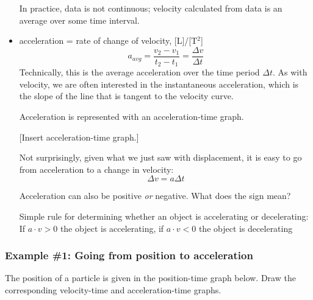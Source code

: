 \begin{itemize}
In practice, data is not continuous; velocity calculated from data is an average over some time interval.



\item acceleration = rate of change of velocity, [L]/[T$^2$]
$$a_{avg}=\frac{v_2-v_1}{t_2-t_1}=\frac{\Delta{v}}{\Delta{t}}$$
  Technically, this is the average acceleration over the time period $\Delta t$. As with velocity, we are often interested in the instantaneous acceleration, which is the slope of the line that is tangent to the velocity curve.

Acceleration is represented with an acceleration-time graph.

[Insert acceleration-time graph.]
\vspace{4cm}
  
Not surprisingly, given what we just saw with displacement, it is easy to go from acceleration to a change in velocity:
$$\Delta{v}=a\Delta{t}$$

Acceleration can also be positive \textit{or} negative. What does the sign mean?

Simple rule for determining whether an object is accelerating or decelerating:\\
If $a\cdot v>0$ the object is accelerating, if $a\cdot v<0$ the object is decelerating  
\end{itemize}


\subsubsection{Example \#1: Going from position to acceleration}
The position of a particle is given in the position-time graph below. Draw the corresponding velocity-time and acceleration-time graphs.


\clearpage
